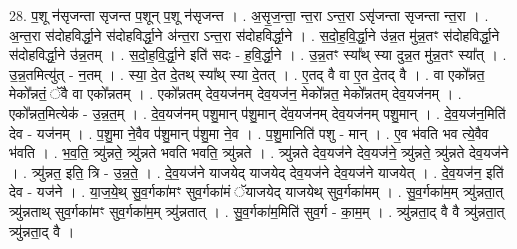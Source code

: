 \documentclass[17pt]{extarticle}
\begin{document}
28. प॒शू न॑सृजन्ता सृजन्त प॒शून् प॒शू न॑सृजन्त । . अ॒सृ॒ज॒न्ता॒ न्त॒रा ऽन्त॒रा ऽसृ॑जन्ता सृजन्ता न्त॒रा । . अ॒न्त॒रा स॑दोहविर्द्धा॒ने स॑दोहविर्द्धा॒ने अ॑न्त॒रा ऽन्त॒रा स॑दोहविर्द्धा॒ने । . स॒दो॒ह॒वि॒र्द्धा॒ने उ॑न्न॒त मु॑न्न॒तꣳ स॑दोहविर्द्धा॒ने स॑दोहविर्द्धा॒ने उ॑न्न॒तम् । . स॒दो॒ह॒वि॒र्द्धा॒ने इति॑ सदः - ह॒वि॒र्द्धा॒ने । . उ॒न्न॒तꣳ स्या᳚थ् स्या दुन्न॒त मु॑न्न॒तꣳ स्या᳚त् । . उ॒न्न॒तमित्यु॑त् - न॒तम् । . स्या॒ दे॒त दे॒तथ् स्या᳚थ् स्या दे॒तत् । . ए॒तद् वै वा ए॒त दे॒तद् वै । . वा एको᳚न्नत॒ मेको᳚न्नतं॒ ॅवै वा एको᳚न्नतम् । . एको᳚न्नतम् देव॒यज॑नम् देव॒यज॑न॒ मेको᳚न्नत॒ मेको᳚न्नतम् देव॒यज॑नम् । . एको᳚न्नत॒मित्येक॑ - उ॒न्न॒त॒म् । . दे॒व॒यज॑नम् पशु॒मान् प॑शु॒मान् दे॑व॒यज॑नम् देव॒यज॑नम् पशु॒मान् । . दे॒व॒यज॑न॒मिति॑ देव - यज॑नम् । . प॒शु॒मा ने॒वैव प॑शु॒मान् प॑शु॒मा ने॒व । . प॒शु॒मानिति॑ पशु - मान् । . ए॒व भ॑वति भव त्ये॒वैव भ॑वति । . भ॒व॒ति॒ त्र्यु॑न्नते॒ त्र्यु॑न्नते भवति भवति॒ त्र्यु॑न्नते । . त्र्यु॑न्नते देव॒यज॑ने देव॒यज॑ने॒ त्र्यु॑न्नते॒ त्र्यु॑न्नते देव॒यज॑ने । . त्र्यु॑न्नत॒ इति॒ त्रि - उ॒न्न॒ते॒ । . दे॒व॒यज॑ने याजयेद् याजयेद् देव॒यज॑ने देव॒यज॑ने याजयेत् । . दे॒व॒यज॑न॒ इति॑ देव - यज॑ने । . या॒ज॒ये॒थ् सु॒व॒र्गका॑मꣳ सुव॒र्गका॑मं ॅयाजयेद् याजयेथ् सुव॒र्गका॑मम् । . सु॒व॒र्गका॑म॒म् त्र्यु॑न्नता॒त् त्र्यु॑न्नताथ् सुव॒र्गका॑मꣳ सुव॒र्गका॑म॒म् त्र्यु॑न्नतात् । . सु॒व॒र्गका॑म॒मिति॑ सुव॒र्ग - का॒म॒म् । . त्र्यु॑न्नता॒द् वै वै त्र्यु॑न्नता॒त् त्र्यु॑न्नता॒द् वै । \newline
\end{document}
